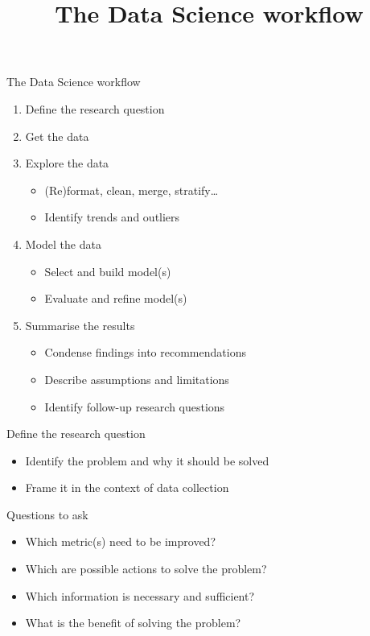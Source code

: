 

\title{The Data Science workflow}



\maketitle

\begin{frame}{The Data Science workflow}
    \begin{enumerate}
        \item Define the \alert{research question}
        \item \alert{Get} the data
        \item \alert{Explore} the data
              \begin{itemize}
                  \item (Re)format, clean, merge, stratify\ldots
                  \item Identify trends and outliers
              \end{itemize}
        \item \alert{Model} the data
              \begin{itemize}
                  \item Select and build model(s)
                  \item Evaluate and refine model(s)
              \end{itemize}
        \item \alert{Summarise} the results
              \begin{itemize}
                  \item Condense findings into recommendations
                  \item Describe assumptions and limitations
                  \item Identify follow\hyp{}up research questions
              \end{itemize}
    \end{enumerate}
\end{frame}

\begin{frame}[t]{Define the research question}
    \begin{itemize}
        \item Identify the problem and \alert{why} it should be solved
        \item Frame it in the context of data collection
    \end{itemize}
    \vfill
    \begin{block}{Questions to ask}
        \begin{itemize}
            \item Which metric(s) need to be improved?
            \item Which are possible actions to solve the problem?
            \item Which information is necessary and sufficient?
            \item What is the benefit of solving the problem?
        \end{itemize}
    \end{block}
\end{frame}

